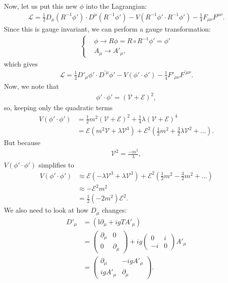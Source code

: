 \documentclass{book}
\numberwithin{equation}{section}
\theoremstyle{definition}
\newcommand{\p}{\partial}
\newcommand{\lag}{\mathcal{L}}
\begin{document}
Now, let us put this new $\phi$ into the Lagrangian:
\begin{align}
\lag = \frac{1}{2}D_\mu (R^{-1}\phi')\cdot D^{\mu}(R^{-1}\phi') - V(R^{-1}\phi' \cdot R^{-1}\phi') - \frac{1}{4}F_{\mu\nu}F^{\mu\nu}.
\end{align} 
Since this is gauge invariant, we can perform a gauge transformation:
\begin{align}
\begin{cases}
&\phi \to R\phi = R\circ R^{-1}\phi' = \phi'\\
&A_\mu \to A'_\mu,
\end{cases}
\end{align}
which gives
\begin{align}
\lag = \frac{1}{2}D'_\mu \phi' \cdot D^{'\mu}\phi' - V(\phi'\cdot \phi')- \frac{1}{4}F'_{\mu\nu}F^{'\mu\nu}.
\end{align}
Now, we note that 
\begin{align}
\phi'\cdot\phi' = (\mathcal{V} + \mathcal{E})^2,
\end{align}
so, keeping only the quadratic terms
\begin{align}
V(\phi'\cdot \phi') &= \frac{1}{2}m^2(\mathcal{V} + \mathcal{E})^2 + \frac{1}{4}\lambda (\mathcal{V} + \mathcal{E})^4\\
&=\mathcal{E}(m^2\mathcal{V} + \lambda \mathcal{V}^3) + \mathcal{E}^2\left(\frac{1}{2}m^2 + \frac{3}{2}\lambda \mathcal{V}^2 + \dots\right).
\end{align}
But because
\begin{align}
\mathcal{V}^2 = \frac{-m^2}{\lambda},
\end{align}
$V(\phi'\cdot \phi')$ simplifies to
\begin{align}
V(\phi' \cdot \phi') &\approx \mathcal{E}(-\lambda \mathcal{V}^3 + \lambda \mathcal{V}^3) + \mathcal{E}^2\left(\frac{1}{2}m^2 - \frac{3}{2}m^2 + \dots\right)\\
&\approx -\mathcal{E}^2m^2\\
&= \frac{1}{2}(-2m^2)\mathcal{E}^2.
\end{align}
We also need to look at how $D_\mu$ changes:
\begin{align}
D'_\mu &= (\mathbb{I}\p_\mu + ig TA'_\mu)\\
&= \begin{pmatrix}
\p_\mu & 0 \\
0& \p_\mu
\end{pmatrix} +
ig\begin{pmatrix}
0 & i \\
-i & 0
\end{pmatrix}A'_\mu\\
&= \begin{pmatrix}
\p_\mu & -igA'_\mu\\
igA'_\mu &  \p_\mu
\end{pmatrix}.
\end{align}
\end{document}
